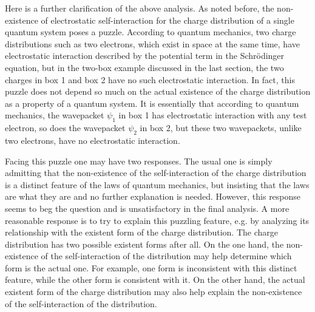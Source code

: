 Here is a further clarification of the above analysis. As noted before, the non-existence of electrostatic self-interaction for the charge distribution of a single quantum system poses a puzzle. According to quantum mechanics, two charge distributions such as two electrons, which exist in space at the same time, have electrostatic interaction described by the potential term in the Schr\"{o}dinger equation, but in the two-box example discussed in the last section, the two charges in box 1 and box 2 have no such electrostatic interaction. In fact, this puzzle does not depend so much on the actual existence of the charge distribution as a property of a quantum system. It is essentially that according to quantum mechanics, the wavepacket $\psi_1$ in box 1 has electrostatic interaction with any test electron, so does the wavepacket $\psi_2$ in box 2, but these two wavepackets, unlike two electrons, have no electrostatic interaction. 

Facing this puzzle one may have two responses. The usual one is simply admitting that the non-existence of the self-interaction of the charge distribution is a distinct feature of the laws of quantum mechanics, but insisting that the laws are what they are and no further explanation is needed. However, this response seems to beg the question and is unsatisfactory in the final analysis. A more reasonable response is to try to explain this puzzling feature, e.g. by analyzing its relationship with the existent form of the charge distribution. The charge distribution has two possible existent forms after all. On the one hand, the non-existence of the self-interaction of the distribution may help determine which form is the actual one. For example, one form is inconsistent with this distinct feature, while the other form is consistent with it. On the other hand, the actual existent form of the charge distribution may also help explain the non-existence of the self-interaction of the distribution.

